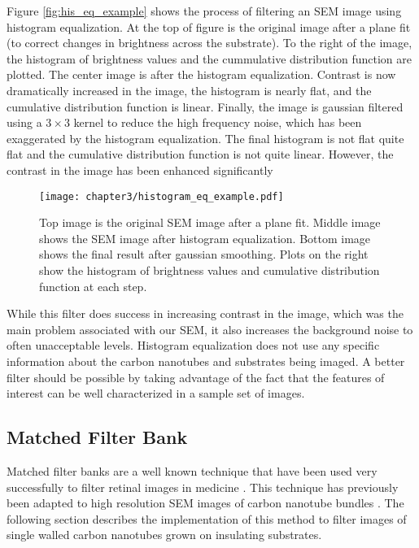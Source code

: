 Figure \ref{fig:his_eq_example} shows the process of filtering an SEM image using histogram equalization. At the top of figure is the original image after a plane fit (to correct changes in brightness across the substrate). To the right of the image, the histogram of brightness values and the cummulative distribution function are plotted. The center image is after the histogram equalization. Contrast is now dramatically increased in the image, the histogram is nearly flat, and the cumulative distribution function is linear. Finally, the image is gaussian filtered using a $3 \times 3$ kernel to reduce the high frequency noise, which has been exaggerated by the histogram equalization. The final histogram is not flat quite flat and the cumulative distribution function is not quite linear. However, the contrast in the image has been enhanced significantly

\begin{figure}
	\centering
	\texttt{[image: chapter3/histogram\_eq\_example.pdf]}
	\caption{Top image is the original SEM image after a plane fit. Middle image shows the SEM image after histogram equalization. Bottom image shows the final result after gaussian smoothing. Plots on the right show the histogram of brightness values and cumulative distribution function at each step.}
	\label{fig:hist_eq}
\end{figure}

While this filter does success in increasing contrast in the image, which was the main problem associated with our SEM, it also increases the background noise to often unacceptable levels. Histogram equalization does not use any specific information about the carbon nanotubes and substrates being imaged. A better filter should be possible by taking advantage of the fact that the features of interest can be well characterized in a sample set of images. 

\subsection{Matched Filter Bank}

Matched filter banks are a well known technique that have been used very successfully to filter retinal images in medicine \cite{Chaudhuri1989}. This technique has previously been adapted to high resolution SEM images of carbon nanotube bundles \cite{Guerrero2014}. The following section describes the implementation of this method to filter images of single walled carbon nanotubes grown on insulating substrates. 

